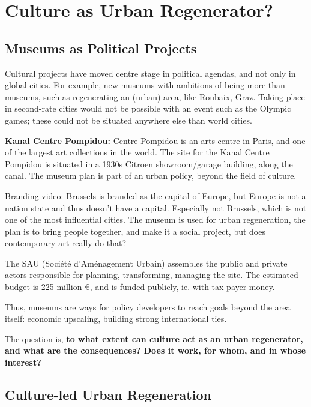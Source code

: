 \documentclass{article}
\begin{document}

\section{Culture as Urban Regenerator?}

\subsection{Museums as Political Projects}

Cultural projects have moved centre stage in political agendas, and not only in global cities.
For example, new museums with ambitions of being more than museums, such as regenerating an (urban) area, like Roubaix, Graz. Taking place in second-rate cities would not be possible with an event such as the Olympic games; these could not be situated anywhere else than world cities.

\textbf{Kanal Centre Pompidou:} Centre Pompidou is an arts centre in Paris, and one of the largest art collections in the world.
The site for the Kanal Centre Pompidou is situated in a 1930s Citroen showroom/garage building, along the canal. 
The museum plan is part of an urban policy, beyond the field of culture. 

Branding video: Brussels is branded as the capital of Europe, but Europe is not a nation state and thus doesn't have a capital. Especially not Brussels, which is not one of the most influential cities. The museum is used for urban regeneration, the plan is to bring people together, and make it a social project, but does contemporary art really do that?

The SAU (Société d'Aménagement Urbain) assembles the public and private actors responsible for planning, transforming, managing the site. The estimated budget is 225 million €, and is funded publicly, ie. with tax-payer money.

Thus, museums are ways for policy developers to reach goals beyond the area itself: economic upscaling, building strong international ties.

The question is, \textbf{to what extent can culture act as an urban regenerator, and what are the consequences? Does it work, for whom, and in whose interest?}

\subsection{Culture-led Urban Regeneration}
\end{document}
